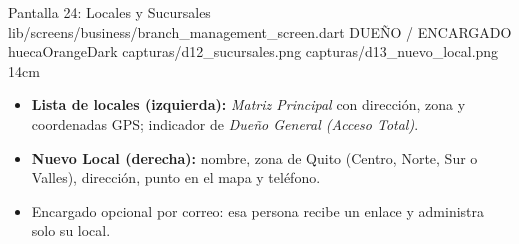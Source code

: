 \pantalladoble
  {Pantalla 24: Locales y Sucursales}
  {lib/screens/business/branch\_management\_screen.dart}
  {DUEÑO / ENCARGADO}
  {huecaOrangeDark}
  {capturas/d12_sucursales.png}
  {capturas/d13_nuevo_local.png}
  {14cm}
  {
    \begin{itemize}[leftmargin=*, itemsep=2pt]
      \item \textbf{Lista de locales (izquierda):} \textit{Matriz Principal} con dirección, zona y coordenadas GPS; indicador de \textit{Dueño General (Acceso Total)}.
      \item \textbf{Nuevo Local (derecha):} nombre, zona de Quito (Centro, Norte, Sur o Valles), dirección, punto en el mapa y teléfono.
      \item Encargado opcional por correo: esa persona recibe un enlace y administra solo su local.
    \end{itemize}
  }

